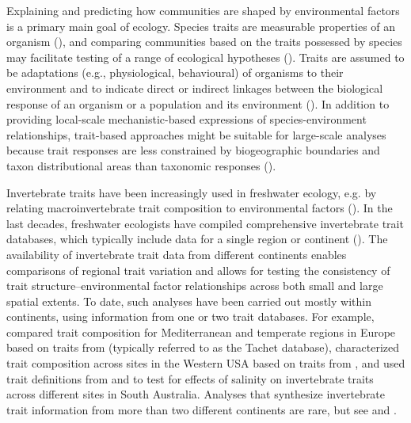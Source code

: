 \documentclass{article}
\begin{document}
Explaining and predicting how communities are shaped by environmental factors is a primary main goal of ecology. Species traits are measurable properties of an organism (\cite{mcgill_rebuilding_2006}), and comparing communities based on the traits possessed by species may facilitate testing of a range of ecological hypotheses (\cite{heino_jani_macroecological_2013}). Traits are assumed to be adaptations (e.g., physiological, behavioural) of organisms to their environment and to indicate direct or indirect linkages between the biological response of an organism or a population and its environment (\cite{southwood_habitat_1977, verberk_delivering_2013}).
In addition to providing local-scale mechanistic-based expressions of species-environment relationships, trait-based approaches might be suitable for large-scale analyses because trait responses are less constrained by biogeographic boundaries and taxon distributional areas than taxonomic responses (\cite{baird_toward_2011, bonada_taxonomic_2007}). 

Invertebrate traits have been increasingly used in freshwater ecology, e.g. by relating macroinvertebrate trait composition to environmental factors (\cite{bhowmik_large_2015, poff_developing_2010, szocs_effects_2014}). In the last decades, freshwater ecologists have compiled comprehensive invertebrate trait databases, which typically include data for a single region or continent (\cite{kefford_integrated_2020, Philips_and_Smith_NZ_DB_2018, schmidt-kloiber_www.freshwaterecology.info_2015, tomanova_trophic_2006, ussegliopolatera_biological_2000, vieira_database_nodate}). The availability of invertebrate trait data from different continents enables comparisons of regional trait variation and allows for testing the consistency of trait structure–environmental factor relationships across both small and large spatial extents. To date, such analyses have been carried out mostly within continents, using information from one or two trait databases. For example, \citet{bonada_taxonomic_2007} compared trait composition for Mediterranean and temperate regions in Europe based on traits from \citet{ussegliopolatera_biological_2000} (typically referred to as the Tachet database), \citet{poff_developing_2010} characterized trait composition across sites in the Western USA based on traits from \citet{poff_functional_2006}, and \citet{botwe_effects_2018} used trait definitions from \citet{poff_functional_2006} and \citet{schafer_trait_2011} to test for effects of salinity on invertebrate traits across different sites in South Australia. Analyses that synthesize invertebrate trait information from more than two different continents are rare, but see \citet{brown_functional_2018} and \citet{statzner_reproductive_1997}. 
\end{document}
